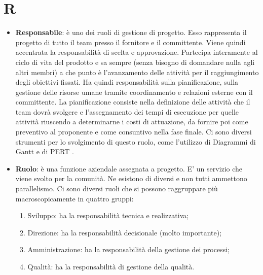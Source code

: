 %
%
%
%

\section{R}

\begin{itemize}
	\item \textbf{Responsabile}: è uno dei ruoli di gestione di progetto. Esso rappresenta il progetto di tutto il team presso il fornitore e il committente. Viene quindi accentrata la responsabilità di scelta e approvazione. \newline
Partecipa interamente al ciclo di vita del prodotto e sa sempre (senza bisogno di domandare nulla agli altri membri) a che punto è l'avanzamento delle attività per il raggiungimento degli obiettivi fissati. \newline
Ha quindi responsabilità sulla pianificazione, sulla gestione delle risorse umane tramite coordinamento e relazioni esterne con il committente. \newline
La pianificazione consiste nella definizione delle attività che il team dovrà svolgere e l'assegnamento dei tempi di esecuzione per quelle attività riuscendo a determinarne i costi di attuazione, da fornire poi come preventivo al proponente e come consuntivo nella fase finale. \newline
Ci sono diversi strumenti per lo svolgimento di questo ruolo, come l'utilizzo di Diagrammi di Gantt e di PERT .

	\item \textbf{Ruolo}: è una funzione aziendale assegnata a progetto. E' un servizio che viene svolto per la comunità. Ne esistono di diversi e non tutti ammettono parallelismo. \newline
Ci sono diversi ruoli che si possono raggruppare più macroscopicamente in quattro gruppi:
	\begin{enumerate}
		\item Sviluppo: ha la responsabilità tecnica e realizzativa;
		\item Direzione: ha la responsabilità decisionale (molto importante);
		\item Amministrazione: ha la responsabilità della gestione dei processi;
		\item Qualità: ha la responsabilità di gestione della qualità.
	\end{enumerate}

\end{itemize}
